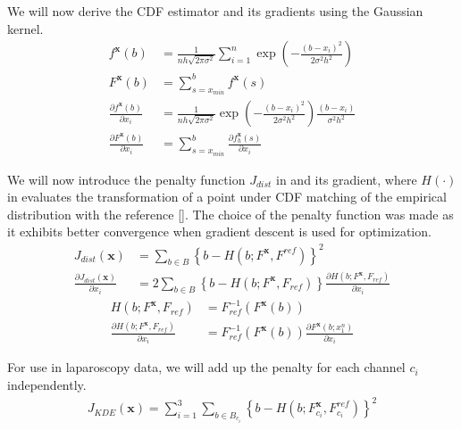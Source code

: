 We will now derive the CDF estimator and its gradients using the Gaussian kernel.
\begin{align}
    f^\mathbf{x} (b) &= \frac{1}{nh \sqrt{2 \pi \sigma^2}} \sum_{i=1}^{n} \exp \left( -\frac{(b-x_i)^2} {2 \sigma^2 h^2}\right) \\
    F^\mathbf{x} (b) &= \sum_{s=x_{min}}^{b} f^\mathbf{x} (s) \label{eqn:kdecdf} \\
    \frac{\partial f^\mathbf{x} (b)}{\partial x_i} &=  \frac{1}{nh \sqrt{2 \pi \sigma^2}} \exp \left( -\frac{(b-x_i)^2} {2 \sigma^2 h^2}\right) \frac{ \left( b - x_i \right) }{ \sigma^2 h^2} \\
    \frac{\partial F^\mathbf{x} (b)} {\partial x_i} &= \sum_{s=x_{min}}^{b} \frac{\partial f^\mathbf{x}_h (s)}{\partial x_i}
\end{align}

We will now introduce the penalty function $J_{dist}$ in  and its gradient, where $H(\cdot)$ in evaluates the transformation of a point under CDF matching of the empirical distribution with the reference []. The choice of the penalty function was made as it exhibits better convergence when gradient descent is used for optimization.
\begin{align}
    J_{dist} (\mathbf{x}) &= \sum_{b \in B} \left\lbrace b - H \left( b; F^\mathbf{x}, F^{ref} \right) \right\rbrace^2 \label{eqn:kdecost} \\
    \frac{ \partial J_{dist} (\mathbf{x})} { \partial x_i} &= 2 \sum_{b \in B} \left\lbrace b - H \left( b; F^\mathbf{x}, F_{ref} \right) \right\rbrace \frac{\partial H \left( b; F^\mathbf{x}, F_{ref} \right)}{\partial x_i}
\end{align}
\begin{align}
    H \left( b; F^\mathbf{x}, F_{ref} \right) &= F_{ref}^{-1} \left( F^\mathbf{x} (b) \right) \label{eqn:cdfinv} \\
    \frac{\partial H \left( b; F^\mathbf{x}, F_{ref} \right)}{\partial x_i} &= F_{ref}^{-1} \left( F^\mathbf{x} (b) \right) \frac{ \partial F^\mathbf{x} (b; x_1^n)} { \partial x_i}
\end{align}

For use in laparoscopy data, we will add up the penalty for each channel $c_i$ independently.
\begin{align}
    J_{KDE}(\mathbf{x}) = \sum_{i=1}^{3} \sum_{b \in B_{c_i}} \left\lbrace b - H \left( b; F^\mathbf{x}_{c_i}, F^{ref}_{c_i} \right) \right\rbrace^2 \label{eqn:cost_kde}
\end{align}

